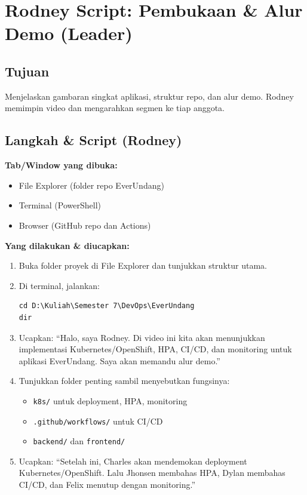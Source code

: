 \documentclass[11pt,a4paper]{article}
\begin{document}
\section{Rodney Script: Pembukaan \& Alur Demo (Leader)}
\subsection*{Tujuan}
Menjelaskan gambaran singkat aplikasi, struktur repo, dan alur demo. Rodney memimpin video dan mengarahkan segmen ke tiap anggota.

\subsection*{Langkah \& Script (Rodney)}
\textbf{Tab/Window yang dibuka:}
\begin{itemize}
  \item File Explorer (folder repo EverUndang)
  \item Terminal (PowerShell)
  \item Browser (GitHub repo dan Actions)
\end{itemize}

\textbf{Yang dilakukan \& diucapkan:}
\begin{enumerate}
  \item Buka folder proyek di File Explorer dan tunjukkan struktur utama.
  \item Di terminal, jalankan:
\begin{lstlisting}
cd D:\Kuliah\Semester 7\DevOps\EverUndang
dir
\end{lstlisting}
  \item Ucapkan:
  “Halo, saya Rodney. Di video ini kita akan menunjukkan implementasi Kubernetes/OpenShift, HPA, CI/CD, dan monitoring untuk aplikasi EverUndang. Saya akan memandu alur demo.”

  \item Tunjukkan folder penting sambil menyebutkan fungsinya:
  \begin{itemize}
    \item \texttt{k8s/} untuk deployment, HPA, monitoring
    \item \texttt{.github/workflows/} untuk CI/CD
    \item \texttt{backend/} dan \texttt{frontend/}
  \end{itemize}

  \item Ucapkan:
  “Setelah ini, Charles akan mendemokan deployment Kubernetes/OpenShift. Lalu Jhonsen membahas HPA, Dylan membahas CI/CD, dan Felix menutup dengan monitoring.”
\end{enumerate}
\end{document}
